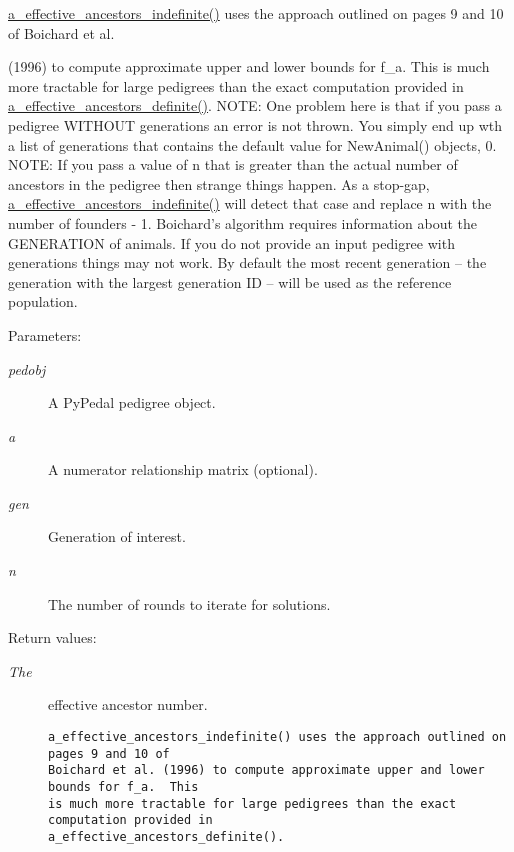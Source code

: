 \hyperlink{namespacePyPedal_1_1pyp__metrics_dcfac272aea7f8f5d0e43ef9d400f6fa}{a\_\-effective\_\-ancestors\_\-indefinite()} uses the approach outlined on pages 9 and 10 of Boichard et al. 

(1996) to compute approximate upper and lower bounds for f\_\-a. This is much more tractable for large pedigrees than the exact computation provided in \hyperlink{namespacePyPedal_1_1pyp__metrics_8821be8acfb9095c5f3776906568110b}{a\_\-effective\_\-ancestors\_\-definite()}. NOTE: One problem here is that if you pass a pedigree WITHOUT generations an error is not thrown. You simply end up wth a list of generations that contains the default value for New\-Animal() objects, 0. NOTE: If you pass a value of n that is greater than the actual number of ancestors in the pedigree then strange things happen. As a stop-gap, \hyperlink{namespacePyPedal_1_1pyp__metrics_dcfac272aea7f8f5d0e43ef9d400f6fa}{a\_\-effective\_\-ancestors\_\-indefinite()} will detect that case and replace n with the number of founders - 1. Boichard's algorithm requires information about the GENERATION of animals. If you do not provide an input pedigree with generations things may not work. By default the most recent generation -- the generation with the largest generation ID -- will be used as the reference population. \begin{Desc}
\item[Parameters:]
\begin{description}
\item[{\em pedobj}]A Py\-Pedal pedigree object. \item[{\em a}]A numerator relationship matrix (optional). \item[{\em gen}]Generation of interest. \item[{\em n}]The number of rounds to iterate for solutions. \end{description}
\end{Desc}
\begin{Desc}
\item[Return values:]
\begin{description}
\item[{\em The}]effective ancestor number.

\footnotesize\begin{verbatim}a_effective_ancestors_indefinite() uses the approach outlined on pages 9 and 10 of
Boichard et al. (1996) to compute approximate upper and lower bounds for f_a.  This
is much more tractable for large pedigrees than the exact computation provided in
a_effective_ancestors_definite().
\end{verbatim}
\normalsize
 \end{description}
\end{Desc}


